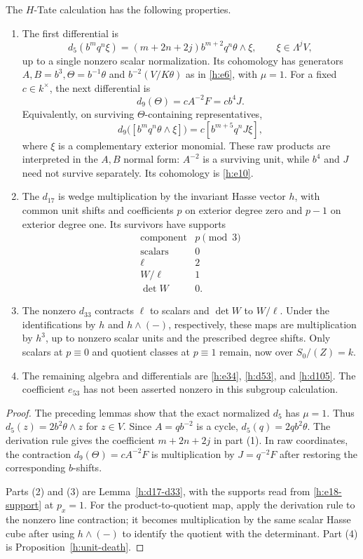 \begin{theorem}
 \label{h:differentials}
 The $H$-Tate calculation has the following properties.
 \begin{enumerate}[label=(\arabic*)]
  \item The first differential is
  \[
  d_5(b^m q^n\xi)
    =(m+2n+2j)b^{m+2}q^n\theta\wedge\xi,
    \qquad \xi\in\Lambda^jV,
  \]
  up to a single nonzero scalar normalization. Its cohomology has
  generators $A,B=b^3,\Theta=b^{-1}\theta$ and
  $b^{-2}(V/K\theta)$ as in \eqref{h:e6}, with $\mu=1$.
  For a fixed $c\in k^{\times}$, the next differential is
  \[
   d_9(\Theta)=cA^{-2}F=cb^4J.
  \]
  Equivalently, on surviving $\Theta$-containing representatives,
  \[
   d_9\bigl([b^m q^n\theta\wedge\xi]\bigr)
     =c[b^{m+5}q^nJ\xi],
  \]
  where $\xi$ is a complementary exterior monomial. These raw
  products are interpreted in the $A,B$ normal form: $A^{-2}$ is
  a surviving unit, while $b^4$ and $J$ need not survive separately.
  Its cohomology is \eqref{h:e10}.
  \item The $d_{17}$ is wedge multiplication by the invariant Hasse
  vector $h$, with common unit shifts and coefficients $p$ on exterior
  degree zero and $p-1$ on exterior degree one. Its survivors have
  supports
  \[
  \begin{array}{c|c}
  \text{component}&p\pmod3\\\hline
  \text{scalars}&0\\
  \ell&2\\
  W/\ell&1\\
  \det W&0.
  \end{array}
  \]
  \item The nonzero $d_{33}$ contracts $\ell$ to scalars and
  $\det W$ to $W/\ell$. Under the identifications by $h$ and
  $h\wedge(-)$, respectively, these maps are multiplication by
  $h^3$, up to nonzero scalar units and the prescribed degree shifts.
  Only scalars at $p\equiv0$ and quotient classes at $p\equiv1$
  remain, now over $S_0/(Z)=k$.
  \item The remaining algebra and differentials are
  \eqref{h:e34}, \eqref{h:d53}, and \eqref{h:d105}. The coefficient
  $e_{53}$ has not been asserted nonzero in this subgroup calculation.
 \end{enumerate}
\end{theorem}

\begin{proof}
The preceding lemmas show that the exact normalized $d_5$ has
$\mu=1$. Thus $d_5(z)=2b^2\theta\wedge z$ for $z\in V$.
Since $A=qb^{-2}$ is a cycle,
$d_5(q)=2qb^2\theta$. The derivation rule gives the coefficient
$m+2n+2j$ in part (1). In raw coordinates, the contraction
$d_9(\Theta)=cA^{-2}F$ is multiplication by $J=q^{-2}F$ after
restoring the corresponding $b$-shifts.

Parts (2) and (3) are Lemma~\ref{h:d17-d33}, with the supports
read from \eqref{h:e18-support} at $p_x=1$. For the product-to-quotient
map, apply the derivation rule to the nonzero line contraction; it
becomes multiplication by the same scalar Hasse cube after using
$h\wedge(-)$ to identify the quotient with the determinant. Part (4)
is Proposition~\ref{h:unit-death}.
\end{proof}

